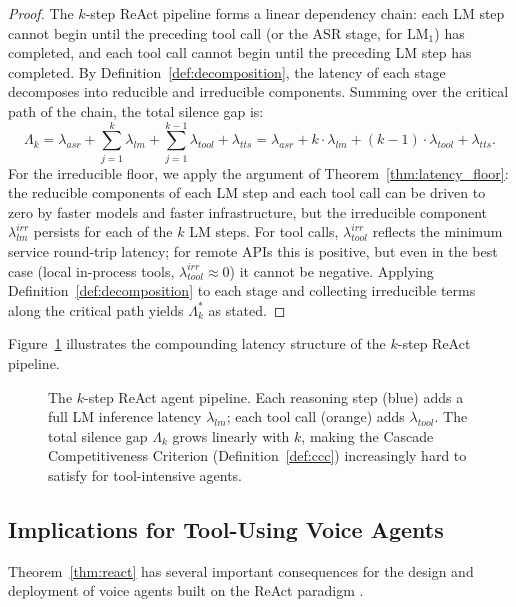 \begin{proof}
The $k$-step ReAct pipeline forms a linear dependency chain:
each LM step cannot begin until the preceding tool call (or the ASR stage, for $\text{LM}_1$)
has completed, and each tool call cannot begin until the preceding LM step has completed.
By Definition~\ref{def:decomposition}, the latency of each stage decomposes into
reducible and irreducible components.
Summing over the critical path of the chain, the total silence gap is:
\[
  \Lambda_k = \lambda_{asr} + \sum_{j=1}^{k} \lambda_{lm} + \sum_{j=1}^{k-1} \lambda_{tool}
              + \lambda_{tts}
  = \lambda_{asr} + k \cdot \lambda_{lm} + (k-1) \cdot \lambda_{tool} + \lambda_{tts}.
\]
For the irreducible floor, we apply the argument of Theorem~\ref{thm:latency_floor}:
the reducible components of each LM step and each tool call can be driven to zero
by faster models and faster infrastructure, but the irreducible component $\lambda_{lm}^{irr}$
persists for each of the $k$ LM steps.
For tool calls, $\lambda_{tool}^{irr}$ reflects the minimum service round-trip latency;
for remote APIs this is positive, but even in the best case
(local in-process tools, $\lambda_{tool}^{irr} \approx 0$) it cannot be negative.
Applying Definition~\ref{def:decomposition} to each stage and collecting
irreducible terms along the critical path yields $\Lambda_k^*$ as stated.
\end{proof}

Figure~\ref{fig:react_loop} illustrates the compounding latency structure of the
$k$-step ReAct pipeline.

\begin{figure}[t]
  \centering
  \resizebox{\linewidth}{!}{%
  }
  \caption{The $k$-step ReAct agent pipeline.
           Each reasoning step (blue) adds a full LM inference latency $\lambda_{lm}$;
           each tool call (orange) adds $\lambda_{tool}$.
           The total silence gap $\Lambda_k$ grows linearly with $k$,
           making the Cascade Competitiveness Criterion (Definition~\ref{def:ccc})
           increasingly hard to satisfy for tool-intensive agents.}
  \label{fig:react_loop}
\end{figure}

\subsection{Implications for Tool-Using Voice Agents}

Theorem~\ref{thm:react} has several important consequences for the design and deployment
of voice agents built on the ReAct paradigm \citep{yao2023react}.

